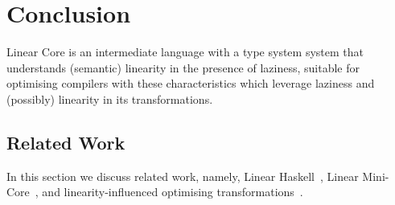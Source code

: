 \documentclass[acmsmall,review]{acmart}
\begin{document}



\section{Conclusion\label{sec:discussion}}

Linear Core is an intermediate language with a type system system that
understands (semantic) linearity in the presence of laziness, suitable for
optimising compilers with these characteristics which leverage laziness and
(possibly) linearity in its transformations.


\subsection{Related Work}

In this section we discuss related work, namely, Linear
Haskell~\cite{cite:linearhaskell}, Linear Mini-Core~\cite{cite:minicore}, and
linearity-influenced optimising
transformations~\cite{cite:let-floating,peytonjones1997a,cite:linearhaskell}.

\end{document}
